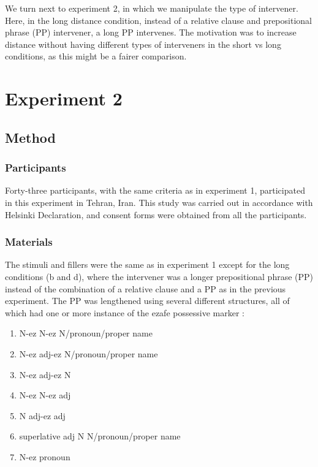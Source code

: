 \documentclass{frontiersSCNS}\usepackage{knitr} %
\begin{document}
We turn next to experiment 2, in which we manipulate the type of intervener. Here, in the long distance condition, instead of  a relative clause and prepositional phrase (PP) intervener,  a long PP intervenes. The motivation was to increase distance without having different types of interveners in the short vs long conditions, as this might be a fairer comparison.

\section{Experiment 2}






\subsection{Method}
\subsubsection{Participants}

Forty-three participants, with  the same criteria as in experiment 1,  participated in this experiment in Tehran, Iran. This study was carried out in accordance with Helsinki Declaration, and  consent forms were obtained from all the participants. 

\subsubsection{Materials}

The stimuli and fillers were the same as in experiment 1 except for the long conditions (b and d), where the intervener was a longer prepositional phrase (PP) instead of the combination of a relative clause and a PP as in the previous experiment. 
The PP was lengthened using several different structures, all of which had one or more instance of the ezafe possessive marker \citep{samvelian2007EZ}:

\begin{enumerate}
\item
N-ez N-ez N/pronoun/proper name
\item
N-ez adj-ez N/pronoun/proper name
\item
N-ez adj-ez N
\item
N-ez N-ez adj
\item
 N adj-ez adj
 \item
 superlative adj N N/pronoun/proper name
 \item  N-ez pronoun
 \end{enumerate}
 
\end{document}
